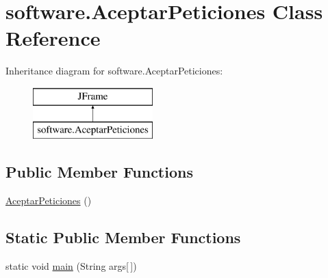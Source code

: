 \hypertarget{classsoftware_1_1_aceptar_peticiones}{}\section{software.\+Aceptar\+Peticiones Class Reference}
\label{classsoftware_1_1_aceptar_peticiones}
Inheritance diagram for software.\+Aceptar\+Peticiones\+:\begin{figure}[H]
\begin{center}
\leavevmode
\includegraphics[height=2.000000cm]{classsoftware_1_1_aceptar_peticiones}
\end{center}
\end{figure}
\subsection*{Public Member Functions}
\begin{DoxyCompactItemize}
\item 
\mbox{\hyperlink{classsoftware_1_1_aceptar_peticiones_a0e69d28d493fab6343457aef7bc93d45}{Aceptar\+Peticiones}} ()
\end{DoxyCompactItemize}
\subsection*{Static Public Member Functions}
\begin{DoxyCompactItemize}
\item 
static void \mbox{\hyperlink{classsoftware_1_1_aceptar_peticiones_a5d8c3817a4a49ecd69165720b24c209d}{main}} (String args\mbox{[}$\,$\mbox{]})
\end{DoxyCompactItemize}
